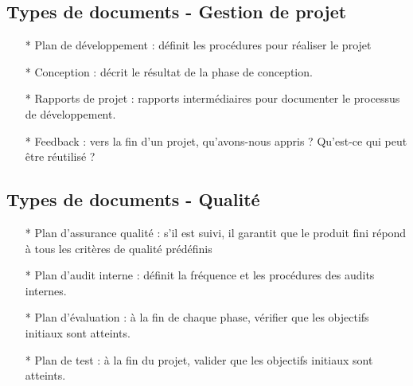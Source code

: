 \documentclass[12pt]{article}
\begin{document}
\subsection{Types de documents - Gestion de projet}
\begin{itemize}
	\item[* ] Plan de développement : définit les procédures pour réaliser le projet
	\item[* ] Conception : décrit le résultat de la phase de conception.
	\item[* ] Rapports de projet : rapports intermédiaires pour documenter le processus de développement.
	\item[* ] Feedback : vers la fin d'un projet, qu'avons-nous appris ? Qu'est-ce qui peut être réutilisé ?
\end{itemize}
\subsection{Types de documents - Qualité}
\begin{itemize}
	\item[* ] Plan d'assurance qualité : s'il est suivi, il garantit que le produit fini répond à
	tous les critères de qualité prédéfinis
	\item[* ] Plan d'audit interne : définit la fréquence et les procédures des audits internes.
	\item[* ] Plan d'évaluation : à la fin de chaque phase, vérifier que les objectifs initiaux sont
	atteints.
	\item[* ] Plan de test : à la fin du projet, valider que les objectifs initiaux sont atteints.
\end{itemize}
\end{document}
